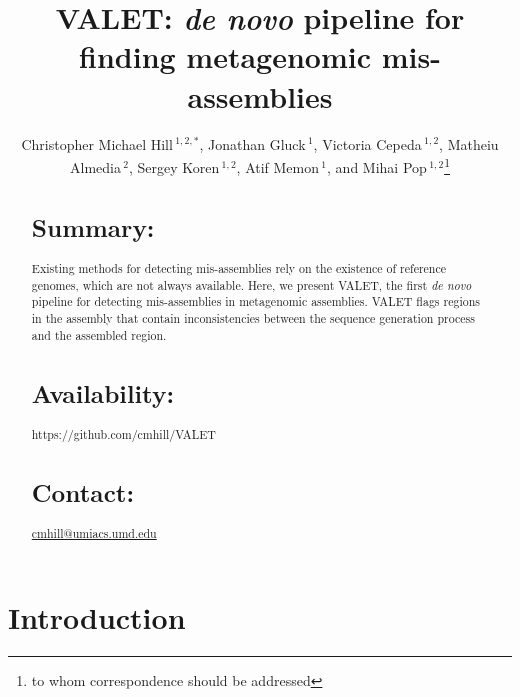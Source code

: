 \documentclass{bioinfo}
\begin{document}

\title[VALET]{VALET: \emph{de novo} pipeline for finding metagenomic mis-assemblies}
\author[Hill \textit{et~al}]{Christopher Michael Hill\,$^{1,2,*}$, Jonathan Gluck\,$^{1}$, Victoria Cepeda\,$^{1,2}$, Matheiu Almedia\,$^{2}$, Sergey Koren\,$^{1,2}$, Atif Memon\,$^{1}$, and Mihai Pop\,$^{1,2}$\footnote{to whom correspondence should be addressed}}
\address{$^{1}$Department of Computer Science,
University of Maryland, College Park, Maryland, 20742
USA\\ $^{2}$ Center
for Bioinformatics and Computational Biology, University of
Maryland, College Park, Maryland, 20742 USA.}



\maketitle

\begin{abstract}

\section{Summary:}
Existing methods for detecting mis-assemblies rely on the existence of reference genomes, which are not always available.
Here, we present VALET, the first \emph{de novo} pipeline for detecting mis-assemblies in metagenomic assemblies.
VALET flags regions in the assembly that contain inconsistencies between the sequence generation process and the assembled region.
\section{Availability:}
https://github.com/cmhill/VALET
\section{Contact:} \href{cmhill@umiacs.umd.edu}{cmhill@umiacs.umd.edu}
\end{abstract}

\section{Introduction}
\end{document}
